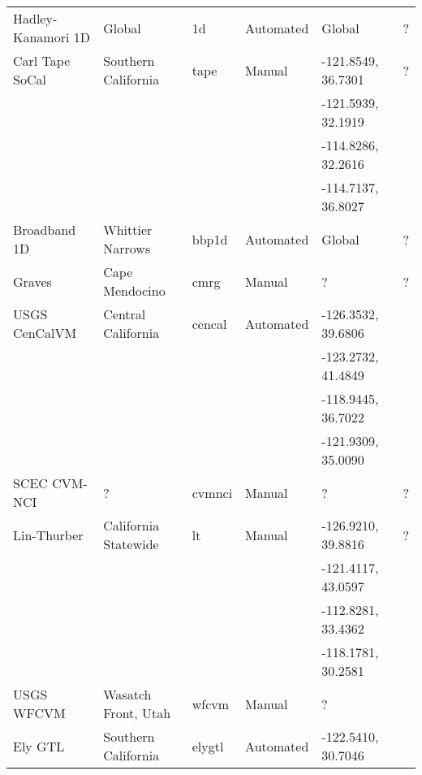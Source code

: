 \begin{table*}[t]
\begin{tabular}[]{lllllp{1.25in}}
Hadley-Kanamori 1D & Global                & 1d            &  Automated   & Global             & ?                            \\
Carl Tape SoCal    & Southern California   & tape          &  Manual      & -121.8549, 36.7301 & ?	                      \\
		   &			   &		   &		  & -121.5939, 32.1919 & 			      \\
		   &                       &               &              & -114.8286, 32.2616 &			      \\
		   &			   &		   & 		  & -114.7137, 36.8027 &			      \\
Broadband 1D       & Whittier Narrows      & bbp1d         &  Automated   & Global             & ?                            \\
Graves             & Cape Mendocino        & cmrg          &  Manual      & ?                  & ?                            \\
USGS CenCalVM      & Central California    & cencal        &  Automated   & -126.3532, 39.6806 & \citet{Brocher_2005_Tech}    \\
                   &                       &               &              & -123.2732, 41.4849 & \citet{Brocher_2006_Proc}    \\
                   &                       &               &              & -118.9445, 36.7022 &                              \\
                   &                       &               &              & -121.9309, 35.0090 &                              \\
SCEC CVM-NCI       & ?                     & cvmnci        &  Manual      & ?                  & ?                            \\
Lin-Thurber        & California Statewide  & lt            &  Manual      & -126.9210, 39.8816 & ?			      \\
		   &                       &               &              & -121.4117, 43.0597 &                              \\
		   &			   &		   &		  & -112.8281, 33.4362 &			      \\
		   &			   &		   &		  & -118.1781, 30.2581 &			      \\
USGS WFCVM         & Wasatch Front, Utah   & wfcvm         &  Manual      & ?                  & \citet{Magistrale_2006_Tech} \\
\hline
Ely GTL            & Southern California   & elygtl        &  Automated   & -122.5410, 30.7046 & \citet{Ely_2010_AGU}         \\

\end{tabular}
\end{table*}
